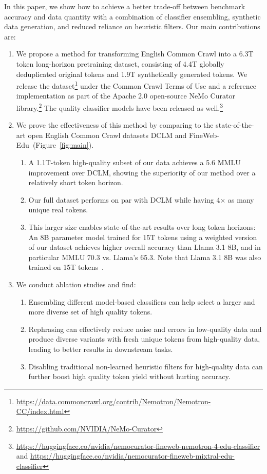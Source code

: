 \documentclass[11pt]{article}
\newcommand{\DCLM}{\textsc{DCLM}\xspace}
\begin{document}
In this paper, we show how to achieve a better trade-off between benchmark accuracy and data quantity with a combination of classifier ensembling, synthetic data generation, and reduced reliance on heuristic filters. Our main contributions are:
\begin{enumerate}
\item We propose a method for transforming English Common Crawl into a 6.3T token long-horizon pretraining dataset, consisting of 4.4T globally deduplicated original tokens and 1.9T synthetically generated tokens.
We release the dataset\footnote{\url{https://data.commoncrawl.org/contrib/Nemotron/Nemotron-CC/index.html}} under the Common Crawl Terms of Use and a reference implementation as part of the Apache 2.0 open-source NeMo Curator library.\footnote{\url{https://github.com/NVIDIA/NeMo-Curator}} The quality classifier models have been released as well.\footnote{\url{https://huggingface.co/nvidia/nemocurator-fineweb-nemotron-4-edu-classifier} and \url{https://huggingface.co/nvidia/nemocurator-fineweb-mixtral-edu-classifier}}
\item We prove the effectiveness of this method by comparing to the state-of-the-art open English Common Crawl datasets \DCLM and FineWeb-Edu~(Figure~\ref{fig:main}).
\begin{enumerate}
\item A 1.1T-token high-quality subset of our data achieves a 5.6 MMLU improvement over \DCLM, showing the superiority of our method over a relatively short token horizon.
\item Our full dataset performs on par with \DCLM while having 4$\times$ as many unique real tokens.
\item This larger size enables state-of-the-art results over long token horizons: An 8B parameter model trained for 15T tokens using a weighted version of our dataset achieves higher overall accuracy than Llama 3.1 8B, and in particular MMLU 70.3 vs. Llama's 65.3. Note that Llama 3.1 8B was also trained on 15T tokens~\citep{dubey2024llama}.
\end{enumerate}
\item We conduct ablation studies and find:
\begin{enumerate}
\item Ensembling different model-based classifiers can help select a larger and more diverse set of high quality tokens.
\item Rephrasing can effectively reduce noise and errors in low-quality data and produce diverse variants with fresh unique tokens from high-quality data, leading to better results in downstream tasks.
\item Disabling traditional non-learned heuristic filters for high-quality data can further boost high quality token yield without hurting accuracy.
\end{enumerate}
\end{enumerate}
\end{document}
